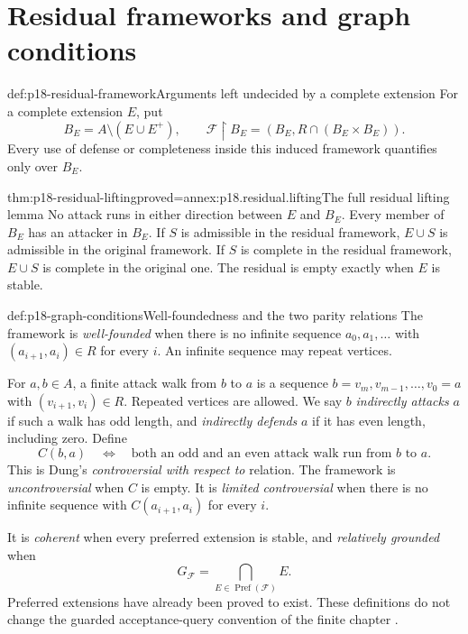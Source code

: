 \section{Residual frameworks and graph conditions}

\begin{hbdefinition}{def:p18-residual-framework}{Arguments left undecided by a complete extension}
For a complete extension \(E\), put
\[
 B_E=A\setminus(E\cup E^+),\qquad
              \mathcal F\!\upharpoonright B_E=(B_E,R\cap(B_E\times B_E)).
\]
Every use of defense or completeness inside this
induced framework quantifies only over \(B_E\).
\end{hbdefinition}

\begin{hblemma}{thm:p18-residual-lifting}{proved=annex:p18.residual.lifting}{The full residual lifting lemma}
No attack runs in either direction between \(E\)
and \(B_E\). Every member of \(B_E\) has an
attacker in \(B_E\). If \(S\) is admissible
in the residual framework, \(E\cup S\) is
admissible in the original framework.
If \(S\) is complete in the residual framework,
\(E\cup S\) is complete in the original one.
The residual is empty exactly when \(E\) is stable.
\end{hblemma}

\begin{hbdefinition}{def:p18-graph-conditions}{Well-foundedness and the two parity relations}
The framework is \emph{well-founded} when there is
no infinite sequence \(a_0,a_1,\ldots\) with
\((a_{i+1},a_i)\in R\) for every \(i\).
An infinite sequence may repeat vertices.

For \(a,b\in A\), a finite attack walk from \(b\) to \(a\) is a
sequence \(b=v_m,v_{m-1},\ldots,v_0=a\)
with \((v_{i+1},v_i)\in R\). Repeated vertices
are allowed. We say \(b\) \emph{indirectly attacks}
\(a\) if such a walk has odd length, and
\emph{indirectly defends} \(a\) if it has even
length, including zero. Define
\[
 C(b,a)\quad\Longleftrightarrow\quad
 \text{both an odd and an even attack walk run from }b\text{ to }a.
\]
This is Dung's \emph{controversial with respect to}
relation. The framework is \emph{uncontroversial}
when \(C\) is empty. It is \emph{limited
controversial} when there is no infinite sequence
with \(C(a_{i+1},a_i)\) for every \(i\).

It is \emph{coherent} when every preferred
extension is stable, and \emph{relatively
grounded} when
\[
            G_{\mathcal F}
              =\bigcap_{E\in\operatorname{Pref}(\mathcal F)}E.
\]
Preferred extensions have already been proved to
exist. These definitions do not change the
guarded acceptance-query convention of the
finite chapter \cite[definitions~29, 31--32]{Dung1995}.
\end{hbdefinition}

